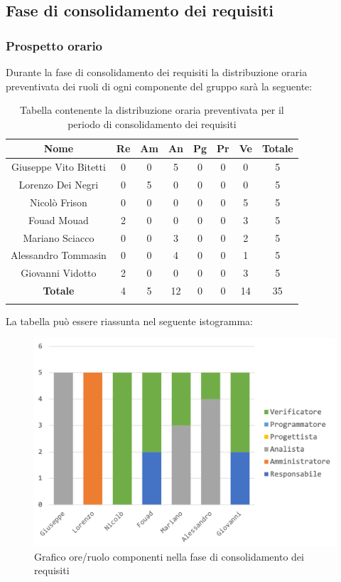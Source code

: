		
		
	\subsection{Fase di consolidamento dei requisiti}
			\subsubsection{Prospetto orario}
			Durante la fase di consolidamento dei requisiti la distribuzione oraria preventivata dei ruoli di ogni componente del gruppo sarà la seguente:
			
			\begin{longtable}{|c|c|c|c|c|c|c|c|}
				\hline
				\rowcolor{lighter-grayer}
				\textbf{Nome} & \textbf{Re} & \textbf{Am} & \textbf{An} & \textbf{Pg}  & \textbf{Pr}   & \textbf{Ve} & \textbf{Totale} \\
				\hline
				\endfirsthead
				
				\hline
				Giuseppe Vito Bitetti & 0 & 0 & 5 & 0 & 0 & 0 & 5\\
				\hline
				\hline
				Lorenzo Dei Negri & 0 & 5 & 0 & 0 & 0 & 0 & 5\\
				\hline
				\hline
				Nicolò Frison & 0 & 0 & 0 & 0 & 0 & 5 & 5\\
				\hline
				\hline
				Fouad Mouad & 2 & 0 & 0 & 0 & 0 & 3 & 5\\
				\hline
				\hline
				Mariano Sciacco & 0 & 0 & 3 & 0 & 0 & 2 & 5\\
				\hline
				\hline
				Alessandro Tommasin & 0 & 0 & 4 & 0 & 0 & 1 & 5\\
				\hline
				\hline
				Giovanni Vidotto & 2 & 0 & 0 & 0 & 0 & 3 & 5\\
				\hline 
				\textbf{Totale} & 4 &  5 & 12 & 0 & 0 & 14 & 35\\
				\hline
				\caption{Tabella contenente la distribuzione oraria preventivata per il periodo di consolidamento dei requisiti}
			\end{longtable}
			\pagebreak
		
			La tabella può essere riassunta nel seguente istogramma:
			\begin{figure}[H]
				\centering
				\includegraphics[width=0.8\linewidth]{./images/preventivo/consRequisiti1.png}
				\caption{Grafico ore/ruolo componenti nella fase di consolidamento dei requisiti}
				\label{fig:grafico suddivione ruoli fase consolidamento requisiti}
			\end{figure}
		
